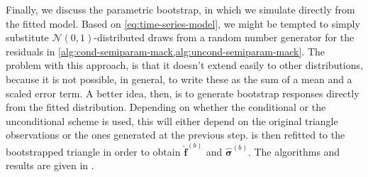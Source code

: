 \documentclass[a4paper]{book}
\begin{document}
Finally, we discuss the parametric bootstrap, in which we simulate directly from the fitted model. Based on \cref{eq:time-series-model}, we might be tempted to simply substitute $\mathcal{N}(0, 1)$-distributed draws from a random number generator for the residuals in \cref{alg:cond-semiparam-mack,alg:uncond-semiparam-mack}. The problem with this approach, is that it doesn't extend easily to other distributions, because it is not possible, in general, to write these as the sum of a mean and a scaled error term. A better idea, then, is to generate bootstrap responses directly from the fitted distribution. Depending on whether the conditional or the unconditional scheme is used, this will either depend on the original triangle observations or the ones generated at the previous step.  is then refitted to the bootstrapped triangle in order to obtain $\widehat{\bm{f}}^{(b)}$ and $\widehat{\bm{\sigma}}^{(b)}$. The algorithms and results are given in .
\end{document}
